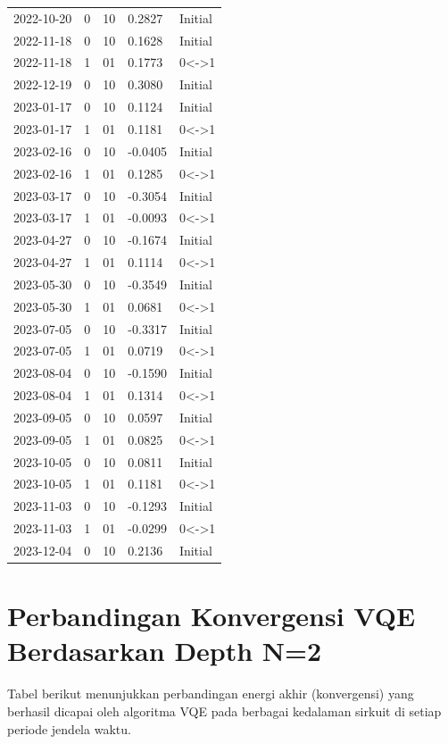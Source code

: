 {\begin{longtable}{lllll}
2022-10-20 & 0 & 10 & 0.2827 & Initial \\
2022-11-18 & 0 & 10 & 0.1628 & Initial \\
2022-11-18 & 1 & 01 & 0.1773 & 0<->1 \\
2022-12-19 & 0 & 10 & 0.3080 & Initial \\
2023-01-17 & 0 & 10 & 0.1124 & Initial \\
2023-01-17 & 1 & 01 & 0.1181 & 0<->1 \\
2023-02-16 & 0 & 10 & -0.0405 & Initial \\
2023-02-16 & 1 & 01 & 0.1285 & 0<->1 \\
2023-03-17 & 0 & 10 & -0.3054 & Initial \\
2023-03-17 & 1 & 01 & -0.0093 & 0<->1 \\
2023-04-27 & 0 & 10 & -0.1674 & Initial \\
2023-04-27 & 1 & 01 & 0.1114 & 0<->1 \\
2023-05-30 & 0 & 10 & -0.3549 & Initial \\
2023-05-30 & 1 & 01 & 0.0681 & 0<->1 \\
2023-07-05 & 0 & 10 & -0.3317 & Initial \\
2023-07-05 & 1 & 01 & 0.0719 & 0<->1 \\
2023-08-04 & 0 & 10 & -0.1590 & Initial \\
2023-08-04 & 1 & 01 & 0.1314 & 0<->1 \\
2023-09-05 & 0 & 10 & 0.0597 & Initial \\
2023-09-05 & 1 & 01 & 0.0825 & 0<->1 \\
2023-10-05 & 0 & 10 & 0.0811 & Initial \\
2023-10-05 & 1 & 01 & 0.1181 & 0<->1 \\
2023-11-03 & 0 & 10 & -0.1293 & Initial \\
2023-11-03 & 1 & 01 & -0.0299 & 0<->1 \\
2023-12-04 & 0 & 10 & 0.2136 & Initial \\
\end{longtable}
}

\section{Perbandingan Konvergensi VQE Berdasarkan Depth N=2}

Tabel berikut menunjukkan perbandingan energi akhir (konvergensi) yang berhasil dicapai oleh algoritma VQE pada berbagai kedalaman sirkuit di setiap periode jendela waktu. 

